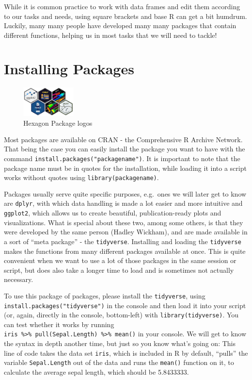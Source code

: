 \documentclass[
]{book}
\begin{document}
While it is common practice to work with data frames and edit them according to our tasks and needs, using square brackets and base R can get a bit humdrum.
Luckily, many many people have developed many many packages that contain different functions, helping us in most tasks that we will need to tackle!

\section{Installing Packages}\label{installing-packages}

\begin{figure}
\centering
\includegraphics[width=\textwidth,height=0.625in]{./img/hexagons.png}
\caption{Hexagon Package logos}\label{id}
\end{figure}

Most packages are available on CRAN - the Comprehensive R Archive Network.
That being the case you can easily install the package you want to have with the command \texttt{install.packages("packagename")}.
It is important to note that the package name must be in quotes for the installation, while loading it into a script works without quotes using \texttt{library(packagename)}.

Packages usually serve quite specific purposes, e.g.~ones we will later get to know are \texttt{dplyr}, with which data handling is made a lot easier and more intuitive and \texttt{ggplot2}, which allows us to create beautiful, publication-ready plots and visualizations.
What is special about these two, among some others, is that they were developed by the same person (Hadley Wickham), and are made available in a sort of ``meta package'' - the \texttt{tidyverse}.
Installing and loading the \texttt{tidyverse} makes the functions from many different packages available at once.
This is quite convenient when we want to use a lot of those packages in the same session or script, but does also take a longer time to load and is sometimes not actually necessary.

To use this package of packages, please install the \texttt{tidyverse}, using \texttt{install.packages("tidyverse")} in the console and then load it into your script (or, again, directly in the console, bottom-left) with \texttt{library(tidyverse)}.
You can test whether it works by running \texttt{iris\ \%\textgreater{}\%\ pull(Sepal.Length)\ \%\textgreater{}\%\ mean()} in your console.
We will get to know the syntax in depth another time, but just so you know what's going on:
This line of code takes the data set \texttt{iris}, which is included in R by default, ``pulls'' the variable \texttt{Sepal.Length} out of the data and runs the \texttt{mean()} function on it, to calculate the average sepal length, which should be 5.8433333.
\end{document}

